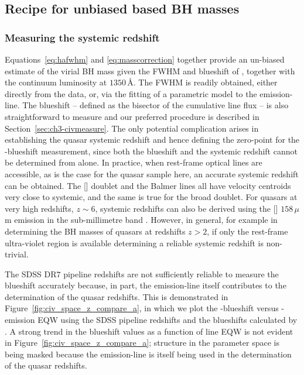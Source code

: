 \label{sec:ch3-application}

\subsection{Recipe for unbiased  based BH masses}
\label{sec:ch3-recipe}

\subsubsection{Measuring the systemic redshift}

Equations~\ref{eq:hafwhm} and \ref{eq:masscorrection} together provide an un-biased estimate of the virial BH mass given the FWHM and blueshift of , together with the continuum luminosity at $1350$\,\AA. 
The FWHM is readily obtained, either directly from the data, or, via the fitting of a parametric model to the  emission-line. 
The blueshift -- defined as the bisector of the cumulative line flux -- is also straightforward to measure and our preferred procedure is described in Section~\ref{sec:ch3-civmeasure}.
The only potential complication arises in establishing the quasar systemic redshift and hence defining the zero-point for the -blueshift measurement, since both the blueshift and the systemic redshift cannot be determined from  alone. 
In practice, when rest-frame optical lines are accessible, as is the case for the quasar sample here, an accurate systemic redshift can be obtained. 
The [] doublet and the Balmer lines all have velocity centroids very close to systemic, and the same is true for the broad  doublet. 
For quasars at very high redshifts, $z\sim6$, systemic redshifts can also be derived using the [] $158$\,$\mu$m emission in the sub-millimetre band \citep[e.g.][]{venemans16}. 
However, in general, for example in determining the BH masses of quasars at redshifts $z>2$, if only the rest-frame ultra-violet region is available determining a reliable systemic redshift is non-trivial. 

The SDSS DR$7$ pipeline redshifts are not sufficiently reliable to measure the  blueshift accurately because, in part, the  emission-line itself contributes to the determination of the quasar redshifts. 
This is demonstrated in Figure~\ref{fig:civ_space_z_compare_a}, in which we plot the -blueshift versus -emission EQW using the SDSS pipeline redshifts and the blueshifts calculated by \citet{shen11}.  
A strong trend in the blueshift values as a function of line EQW is not evident in Figure~\ref{fig:civ_space_z_compare_a}; structure in the parameter space is being masked because the  emission-line is itself being used in the determination of the quasar redshifts. 


